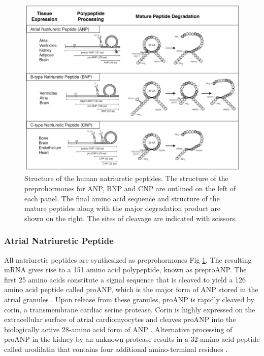 \documentclass[14pt,a4paper,onecolumn]{extarticle}
\begin{document}
\begin{figure}
    \centering
    \includegraphics[scale=0.4]{../../images/NP_structure.png}
    \caption{Structure of the human natriuretic peptides. The structure of the preprohormones for ANP, BNP and CNP are outlined on the left of each panel. The final amino acid sequence and structure of the mature peptides along with the major degradation product are shown on the right. The sites of cleavage are indicated with scissors.}
    \label{NP_structure}
\end{figure}

\subsubsection{Atrial Natriuretic Peptide}

All natriuretic peptides are synthesized as preprohormones Fig \ref{NP_structure}.
The resulting mRNA gives rise to a 151 amino acid polypeptide, known as preproANP. The first 25 amino acids constitute a signal sequence that is cleaved to yield a 126 amino acid peptide called proANP, which is the major form of ANP stored in the atrial granules \citep{Oikawa1984}.
Upon release from these granules, proANP is rapidly cleaved by corin, a transmembrane cardiac serine protease. Corin is highly expressed on the extracellular surface of atrial cardiomyocytes and cleaves proANP into the biologically active 28-amino acid form of ANP \citep{Yan2000}.
Alternative processing of proANP in the kidney by an unknown protease results in a 32-amino acid peptide called urodilatin that contains four additional amino-terminal residues \citep{Forssmann1998}.
\end{document}
